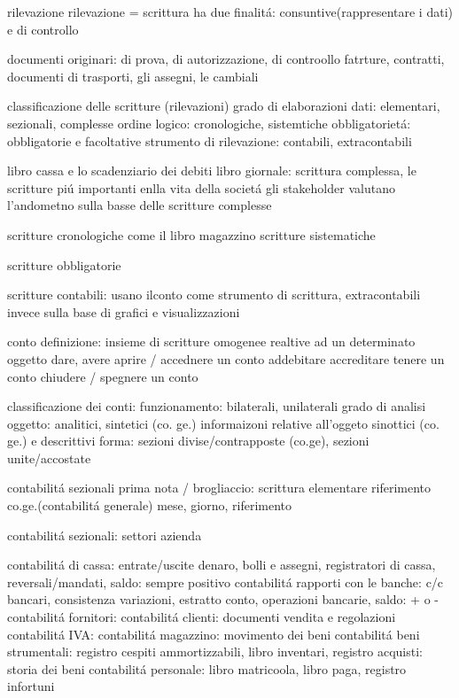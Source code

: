 \documentclass{article}
\begin{document}
rilevazione
rilevazione = scrittura
ha due finalit\'a: consuntive(rappresentare i dati) e di controllo

documenti originari: di prova, di autorizzazione, di controollo
fatrture, contratti, documenti di trasporti, gli assegni, le cambiali

classificazione delle scritture (rilevazioni)
grado di elaborazioni dati: elementari, sezionali, complesse
ordine logico: cronologiche, sistemtiche
obbligatoriet\'a: obbligatorie e facoltative
strumento di rilevazione: contabili, extracontabili

libro cassa e lo scadenziario dei debiti
libro giornale: scrittura complessa, le scritture pi\'u importanti enlla vita della societ\'a
gli stakeholder valutano l'andometno sulla basse delle scritture complesse

scritture cronologiche come il libro magazzino
scritture sistematiche

scritture obbligatorie

scritture contabili: usano ilconto come strumento di scrittura,
extracontabili invece sulla base di grafici e visualizzazioni

conto
definizione: insieme di scritture omogenee realtive ad un determinato oggetto
dare, avere
aprire / accednere un conto
addebitare
accreditare
tenere un conto
chiudere / spegnere un conto

classificazione dei conti:
funzionamento: bilaterali, unilaterali
grado di analisi oggetto: analitici, sintetici (co. ge.)
informaizoni relative all'oggeto sinottici (co. ge.) e descrittivi
forma: sezioni divise/contrapposte (co.ge), sezioni unite/accostate

contabilit\'a sezionali
prima nota / brogliaccio: scrittura elementare riferimento co.ge.(contabilit\'a generale)
mese, giorno, riferimento

contabilit\'a sezionali: settori azienda

contabilit\'a di cassa: entrate/uscite denaro, bolli e assegni, registratori di cassa, reversali/mandati, saldo: sempre positivo
contabilit\'a rapporti con le banche: c/c bancari, consistenza variazioni, estratto conto, operazioni bancarie, saldo: + o -
contabilit\'a fornitori: 
contabilit\'a clienti: documenti vendita e regolazioni
contabilit\'a IVA: 
contabilit\'a magazzino: movimento dei beni
contabilit\'a beni strumentali: registro cespiti ammortizzabili, libro inventari, registro acquisti: storia dei beni
contabilit\'a personale: libro matricoola, libro paga, registro infortuni
\end{document}
